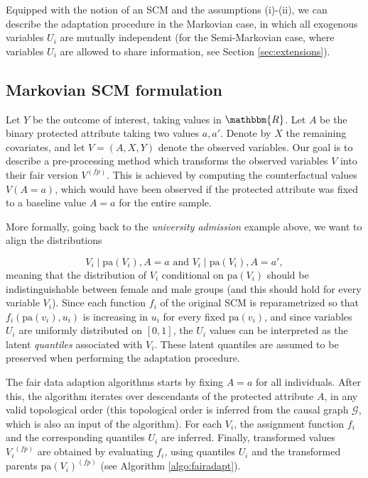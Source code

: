 \documentclass[
  nojss]{jss}
\begin{document}
Equipped with the notion of an SCM and the assumptions (i)-(ii), we can
describe the adaptation procedure in the Markovian case, in which all
exogenous variables \(U_i\) are mutually independent (for the
Semi-Markovian case, where variables \(U_i\) are allowed to share
information, see Section \ref{sec:extensions}).

\hypertarget{markovian-scm-formulation}{%
\subsection{Markovian SCM formulation}\label{markovian-scm-formulation}}

Let \(Y\) be the outcome of interest, taking values in \(\mathbbm{R}\).
Let \(A\) be the binary protected attribute taking two values \(a, a'\).
Denote by \(X\) the remaining covariates, and let \(V = (A, X, Y)\)
denote the observed variables. Our goal is to describe a pre-processing
method which transforms the observed variables \(V\) into their fair
version \( {V}^{(fp)}\). This is achieved by computing the
counterfactual values \(V(A = a)\), which would have been observed if
the protected attribute was fixed to a baseline value \(A = a\) for the
entire sample.

More formally, going back to the \emph{university admission} example
above, we want to align the distributions

\[V_i \mid \mathrm{pa}(V_i), A = a \text{ and } V_i \mid \mathrm{pa}(V_i), A = a',\]
meaning that the distribution of \(V_i\) conditional on
\(\mathrm{pa}(V_i)\) should be indistinguishable between female and male
groups (and this should hold for every variable \(V_i\)). Since each
function \(f_i\) of the original SCM is reparametrized so that
\(f_i(\mathrm{pa}(v_i), u_i)\) is increasing in \(u_i\) for every fixed
\(\mathrm{pa}(v_i)\), and since variables \(U_i\) are uniformly
distributed on \([0, 1]\), the \(U_i\) values can be interpreted as the
latent \emph{quantiles} associated with \(V_i\). These latent quantiles
are assumed to be preserved when performing the adaptation procedure.

The fair data adaption algorithms starts by fixing \(A = a\) for all
individuals. After this, the algorithm iterates over descendants of the
protected attribute \(A\), in any valid topological order (this
topological order is inferred from the causal graph \(\mathcal{G}\),
which is also an input of the algorithm). For each \(V_i\), the
assignment function \(f_i\) and the corresponding quantiles \(U_i\) are
inferred. Finally, transformed values \( {V_i}^{(fp)}\) are obtained by
evaluating \(f_i\), using quantiles \(U_i\) and the transformed parents
\( {\mathrm{pa}(V_i)}^{(fp)}\) (see Algorithm \ref{algo:fairadapt}).
\end{document}

